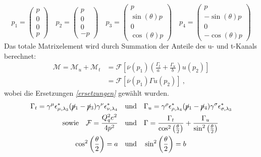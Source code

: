 \begin{equation}
p_1 = \left(\begin{array}{c}p \\ 0 \\ 0 \\ p\end{array}\right) \quad 	p_2 = \left(\begin{array}{c}p \\ 0 \\ 0 \\ -p\end{array}\right) \quad p_3 = \left(\begin{array}{c}p \\ \sin(\theta)p \\ 0 \\ \cos(\theta)p \end{array}\right) \quad p_4 = \left(\begin{array}{c}p \\ -\sin(\theta)p \\ 0 \\ -\cos(\theta)p \end{array}\right)
\label{vierervektoren}
\end{equation}
Das totale Matrixelement wird durch Summation der Anteile des u- und t-Kanals berechnet: 
\begin{equation}
\begin{aligned}
\mathcal{M} = \mathcal{M}_u + \mathcal{M}_t &= \mathcal{F} \left[\overline{\nu}(p_1) \left(\frac{\Gamma_t}{a}  +
\frac{\Gamma_u}{b} \right) u(p_2) \right] \\
&= \mathcal{F} \left[ \overline{\nu}(p_1) \Gamma u(p_2)\right]~,
\end{aligned}
\end{equation}
wobei die Ersetzungen \textit{\autoref{ersetzungen}} gewählt wurden.
\begin{equation}
\begin{split}
\Gamma_t = \gamma^\mu \epsilon^*_{\mu, \lambda_3} (\cancel{p}_1- \cancel{p}_3)  \gamma^\nu \epsilon^*_{\nu, \lambda_4} \quad &\text{und} \quad \Gamma_u = \gamma^\rho \epsilon^*_{\rho, \lambda_4} (\cancel{p}_1- \cancel{p}_4)  \gamma^\sigma \epsilon^*_{\sigma, \lambda_3} \\
\text{sowie} \quad \mathcal{F} = \frac{Q_q^2e^2}{4p^2} \quad &\text{und} \quad \Gamma = \frac{\Gamma_t}{\cos^2\left(\frac{\theta}{2}\right)}  +
\frac{\Gamma_u}{\sin^2\left(\frac{\theta}{2}\right)} \\
\cos^2\left(\frac{\theta}{2}\right) = a \quad &\text{und} \quad \sin^2\left(\frac{\theta}{2}\right) = b
\end{split}
\label{ersetzungen}
\end{equation}
